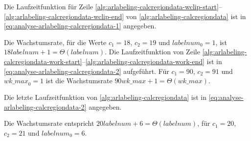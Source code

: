 Die Laufzeitfunktion für Zeile
 \ref{alg:arlabeling-calcregiondata-wclip-start}--\ref{alg:arlabeling-calcregiondata-wclip-end} von
 \autoref{alg:arlabeling-calcregiondata} ist in \autoref{eq:analyse-arlabeling-calcregiondata-1} angegeben.

Die Wachstumsrate, für die Werte $c_{1} = 18$, $c_{2} = 19$ und $\mathit{labelnum}_{0} = 1$, ist
 $18\mathit{labelnum} + 1 = \Theta(\mathit{labelnum})$. Die Laufzeitfunktion von Zeile
 \ref{alg:arlabeling-calcregiondata-work-start}--\ref{alg:arlabeling-calcregiondata-work-end} ist in
 \autoref{eq:analyse-arlabeling-calcregiondata-2} aufgeführt. Für $c_{1} = 90$, $c_{2} = 91$ und
 $\mathit{wk\_max}_{0} = 1$ ist die Wachstumsrate $90\mathit{wk\_max} + 1 = \Theta(wk\_max)$.

Die letzte Laufzeitfunktion von \autoref{alg:arlabeling-calcregiondata} ist in
 \autoref{eq:analyse-arlabeling-calcregiondata-2} angegeben.

Die Wachstumsrate entspricht $20\mathit{labelnum} + 6 = \Theta(\mathit{labelnum})$, für $c_{1} = 20$, $c_{2} = 21$ und
 $\mathit{labelnum}_{0} = 6$.

